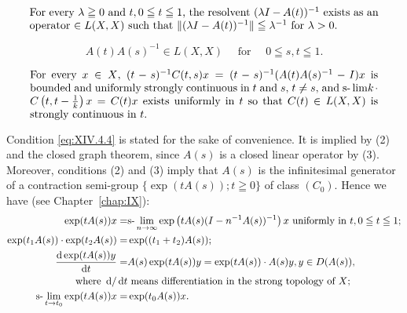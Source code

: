 \begin{equation}\label{eq:XIV.4.3}
\parbox{0.92\linewidth}{\everymath{}\let\limits\nolimits For every $\lambda \geqq 0$ and $t, 0 \leqq t \leqq 1$, the resolvent $(\lambda I - A(t))^{-1}$ exists as an operator $\in L(X, X)$ such that $\| (\lambda I - A(t))^{-1} \| \leqq \lambda^{-1}$ for $\lambda > 0$.}
\end{equation}

\begin{equation}\label{eq:XIV.4.4}
A (t) A (s) ^{-1} \in L (X, X) \quad \text{ for } \quad 0 \leqq s, t \leqq 1.
\end{equation}

\begin{equation}\label{eq:XIV.4.5}
\parbox{0.92\linewidth}{\everymath{}\let\limits\nolimits For every $x \in X$, $(t - s)^{-1} C(t, s) x = (t - s)^{-1}(A(t) A(s)^{-1} - I)x$ is bounded and uniformly strongly continuous in $t$ and $s$, $t \neq s$, and \slim $k \cdot C\left(t, t - \frac{1}{k}\right)x = C(t)x$ exists uniformly in $t$ so that $C(t) \in L(X, X)$ is strongly continuous in $t$.}
\end{equation}


\begin{remarku} Condition \eqref{eq:XIV.4.4} is stated for the sake of convenience. It is implied by (2) and the closed graph theorem, since $A(s)$ is a closed linear operator by ($3$). Moreover, conditions (2) and ($3$) imply that $A(s)$ is the infinitesimal generator of a contraction semi-group $\{\exp(tA(s)); t \geqq 0\}$ of class $(C_0)$. Hence we have (see Chapter~\ref{chap:IX}): 
\begin{align}
    \exp (t A (s)) x = & \text{s-}\lim _{n \rightarrow \infty} \exp \left(t A (s) (I - n ^{-1} A (s)) ^{-1}\right) x \text{ uniformly in } t, 0 \leqq t \leqq 1; \label{eq:XIV.4.6} \\
    \exp (t _{1} A (s)) \cdot \exp (t _{2} A (s)) = & \exp ((t _{1} + t _{2}) A (s)); \label{eq:XIV.4.7} \\
    \frac {\mathop{}\!\mathrm{d} \exp (t A (s)) y}{\mathop{}\!\mathrm{d} t} = & A (s) \exp (t A (s)) y = \exp (t A (s)) \cdot A (s) y, y\in D (A (s)), \notag \\  \text{where } \mathop{}\!\mathrm{d} / \mathop{}\!\mathrm{d} t & \text{ means differentiation in the strong topology of } X; \label{eq:XIV.4.8} \\
    \text{s-}\lim _ {t \to t _{0}} \exp (t A (s)) x = & \exp (t _{0} A (s)) x. \label{eq:XIV.4.9}
\end{align}
\end{remarku}

